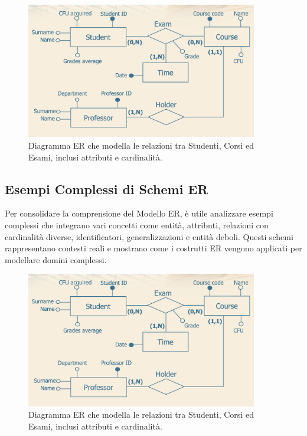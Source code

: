 \begin{figure}[h!]
    \centering
    \includegraphics[width=0.9\textwidth]{immagini/er_schema_student_course_exam.png} %
    \caption{Diagramma ER che modella le relazioni tra Studenti, Corsi ed Esami, inclusi attributi e cardinalità.}
    \label{fig:er_schema_student_course_exam}
\end{figure}

\subsection{Esempi Complessi di Schemi ER}
Per consolidare la comprensione del Modello ER, è utile analizzare esempi complessi che integrano vari concetti come entità, attributi, relazioni con cardinalità diverse, identificatori, generalizzazioni e entità deboli. Questi schemi rappresentano contesti reali e mostrano come i costrutti ER vengono applicati per modellare domini complessi.

\begin{figure}[h!]
    \centering
    \includegraphics[width=0.9\textwidth]{immagini/er_schema_student_course_exam.png} %
    \caption{Diagramma ER che modella le relazioni tra Studenti, Corsi ed Esami, inclusi attributi e cardinalità.}
    \label{fig:er_schema_student_course_exam}
\end{figure}

